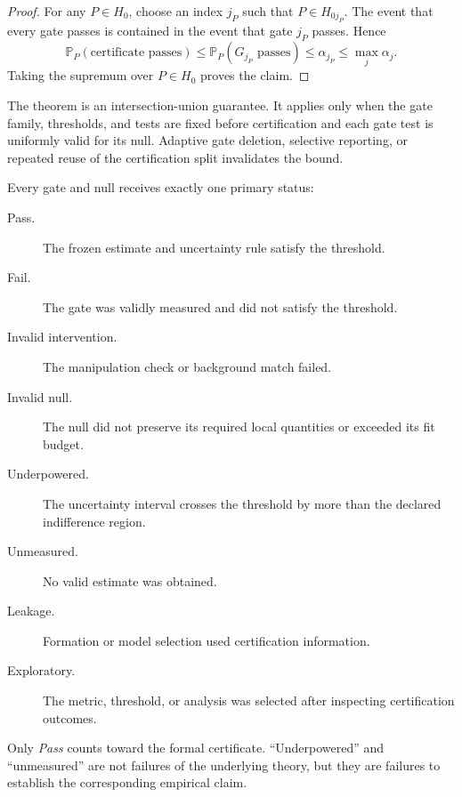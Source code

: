 \begin{proof}
For any \(P\in H_0\), choose an index \(j_P\) such that \(P\in H_{0j_P}\).
The event that every gate passes is contained in the event that gate \(j_P\)
passes. Hence
\[
\mathbb P_P(\text{certificate passes})
\leq
\mathbb P_P(G_{j_P}\text{ passes})
\leq
\alpha_{j_P}
\leq
\max_j\alpha_j.
\]
Taking the supremum over \(P\in H_0\) proves the claim.
\end{proof}

The theorem is an intersection-union guarantee. It applies only when the gate
family, thresholds, and tests are fixed before certification and each gate test
is uniformly valid for its null. Adaptive gate deletion, selective reporting,
or repeated reuse of the certification split invalidates the bound.


Every gate and null receives exactly one primary status:
\begin{description}
\item[Pass.] The frozen estimate and uncertainty rule satisfy the threshold.
\item[Fail.] The gate was validly measured and did not satisfy the threshold.
\item[Invalid intervention.] The manipulation check or background match
 failed.
\item[Invalid null.] The null did not preserve its required local quantities
 or exceeded its fit budget.
\item[Underpowered.] The uncertainty interval crosses the threshold by more
 than the declared indifference region.
\item[Unmeasured.] No valid estimate was obtained.
\item[Leakage.] Formation or model selection used certification information.
\item[Exploratory.] The metric, threshold, or analysis was selected after
 inspecting certification outcomes.
\end{description}
Only \emph{Pass} counts toward the formal certificate. ``Underpowered'' and
``unmeasured'' are not failures of the underlying theory, but they are failures
to establish the corresponding empirical claim.



